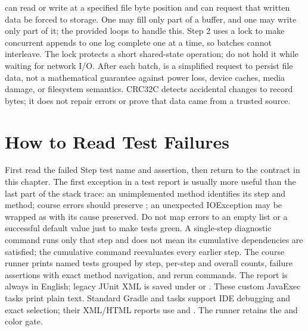  can read or write at a specified file byte position and can request that written data be forced to storage. One  may fill only part of a buffer, and one  may write only part of it; the provided  loops to handle this. Step 2 uses a lock to make concurrent appends to one log complete one at a time, so batches cannot interleave. The lock protects a short shared-state operation; do not hold it while waiting for network I/O. After each batch,  is a simplified request to persist file data, not a mathematical guarantee against power loss, device caches, media damage, or filesystem semantics. CRC32C detects accidental changes to record bytes; it does not repair errors or prove that data came from a trusted source.

\section{How to Read Test Failures}
First read the failed Step test name and assertion, then return to the contract in this chapter. The first exception in a test report is usually more useful than the last part of the stack trace: an unimplemented method identifies its step and method; course errors should preserve ; an unexpected IOException may be wrapped as  with its cause preserved. Do not map errors to an empty list or a successful default value just to make tests green. A single-step diagnostic command runs only that step and does not mean its cumulative dependencies are satisfied; the cumulative command reevaluates every earlier step.
The course runner prints named tests grouped by step, per-step and overall counts, failure assertions with exact method navigation, and rerun commands. The report is always in English; legacy JUnit XML is saved under  or . These custom JavaExec tasks print plain text. Standard Gradle  and  tasks support IDE debugging and exact  selection; their XML/HTML reports use  and . The runner retains the  and  color gate.

